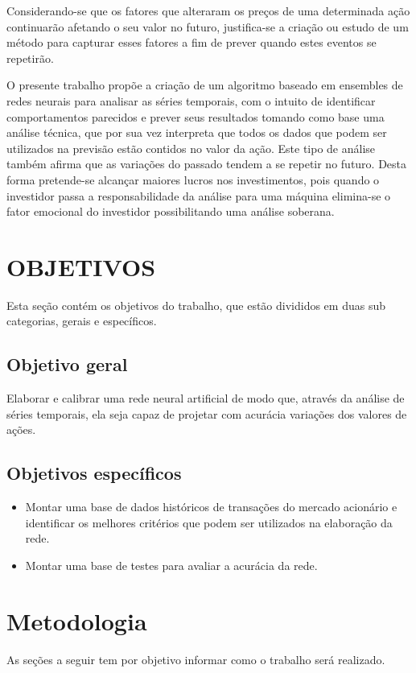 	Considerando-se que os fatores que alteraram os preços de uma determinada ação continuarão afetando o seu valor no futuro, justifica-se a criação ou estudo de um método para capturar esses fatores a fim de prever quando estes eventos se repetirão.
	
	O presente trabalho propõe a criação de um algoritmo baseado em ensembles de redes neurais para analisar as séries temporais, com o intuito de identificar comportamentos parecidos e prever seus resultados tomando como base uma análise técnica, que por sua vez interpreta que todos os dados que podem ser utilizados na previsão estão contidos no valor da ação. Este tipo de análise também afirma que as variações do passado tendem a se repetir no futuro\cite{GIACOMELL}. Desta forma pretende-se alcançar maiores lucros nos investimentos, pois quando o investidor passa a responsabilidade da análise para uma máquina elimina-se o fator emocional do investidor possibilitando uma análise soberana. 

\section{OBJETIVOS}
Esta seção contém os objetivos do trabalho, que estão divididos em duas sub categorias, gerais e específicos.

\subsection{Objetivo geral}
Elaborar e calibrar uma rede neural artificial de modo que,  através da análise de séries temporais, ela seja capaz de projetar com acurácia variações dos valores de ações.

\subsection{Objetivos específicos}

 \begin{itemize}
	\item Montar uma base de dados históricos de transações do mercado acionário e identificar os melhores critérios que podem ser utilizados na elaboração da rede.
	\item Montar uma base de testes para avaliar a acurácia da rede.
\end{itemize}

\section{Metodologia}
As seções a seguir tem por objetivo informar como o trabalho será realizado.

